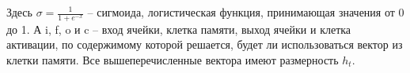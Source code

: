 Здесь $\sigma = \frac{1}{1+e^{-x}} $ -- сигмоида, логистическая функция, принимающая значения от 0 до 1. А i, f, o и c -- вход ячейки, клетка памяти, выход ячейки и клетка активации, по содержимому которой решается, будет ли использоваться вектор из клетки памяти. Все вышеперечисленные вектора имеют размерность $h_t$.

